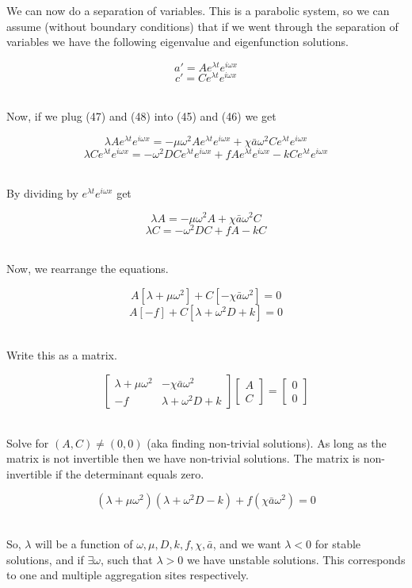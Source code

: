 \documentclass[]{article}
\numberwithin{equation}{section}		%
\begin{document}
We can now do a separation of variables.  This is a parabolic system, so we can assume (without boundary conditions) that if we went through the separation of variables we have the following eigenvalue and eigenfunction solutions.

\begin{equation}
a'=Ae^{\lambda t}e^{i\omega x}
\end{equation}
\begin{equation}
c'=Ce^{\lambda t}e^{i\omega x}
\end{equation}\

Now, if we plug (47) and (48) into (45) and (46) we get

$$\lambda Ae^{\lambda t}e^{i\omega x}=-\mu\omega^2Ae^{\lambda t}e^{i\omega x}+\chi\bar{a}\omega^2Ce^{\lambda t}e^{i\omega x}$$
$$\lambda Ce^{\lambda t}e^{i\omega x}=-\omega^2DCe^{\lambda t}e^{i\omega x}+fAe^{\lambda t}e^{i\omega x}-kCe^{\lambda t}e^{i\omega x}$$\

By dividing by $e^{\lambda t}e^{i\omega x}$ get

$$\lambda A=-\mu\omega^2A+\chi\bar{a}\omega^2C$$
$$\lambda C=-\omega^2DC+fA-kC$$\

Now, we rearrange the equations.

$$A[\lambda+\mu\omega^2]+C[-\chi\bar{a}\omega^2]=0$$
$$A[-f]+C[\lambda+\omega^2D+k]=0$$\

Write this as a matrix.

$$\begin{bmatrix}
\lambda+\mu\omega^2 & -\chi\bar{a}\omega^2 \\
-f & \lambda+\omega^2D+k
\end{bmatrix}
\begin{bmatrix}
A\\
C
\end{bmatrix}=
\begin{bmatrix}
0\\
0
\end{bmatrix}$$\

Solve for $(A,C)\neq(0,0)$ (aka finding non-trivial solutions).  As long as the matrix is not invertible then we have non-trivial solutions.  The matrix is non-invertible if the determinant equals zero.

$$(\lambda+\mu\omega^2)(\lambda+\omega^2D-k)+f(\chi\bar{a}\omega^2)=0$$\

So, $\lambda$ will be a function of $\omega, \mu, D, k, f, \chi, \bar{a}$, and we want $\lambda<0$ for stable solutions, and if $\exists\omega$, such that $\lambda>0$ we have unstable solutions.  This corresponds to one and multiple aggregation sites respectively.
\end{document}
